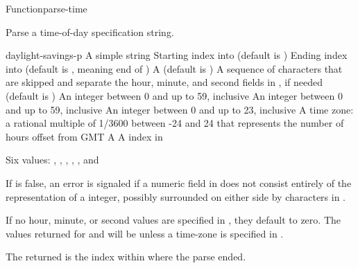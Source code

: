 \documentclass[10pt,twoside,english,pdftex]{article}
\begin{document}

\begin{functiondoc}{Function}{parse-time}{%
     
    }
% 

\fnsyntax

\fnpurpose Parse a time-of-day specification string.

\fnpackage {} 

\fnmodule {}

\fnargs
\begin{args}{daylight-savings-p}
\arg[string] A simple string
\arg[start] Starting index into  (default is )
\arg[end] Ending index into  (default is \nil, meaning
end of )
 A  (default is \nil)
\arg[separators] A sequence of characters that are skipped and separate the
 hour, minute, and second fields in , if needed (default is 
 )
\arg[second] An integer between 0 and up to 59, inclusive
\arg[minute] An integer between 0 and up to 59, inclusive
\arg[hour] An integer between 0 and up to 23, inclusive
 A time zone: a rational multiple of 1/3600 between
 -24 and 24 that represents the number of hours offset from GMT
 A 
\arg[position] A index in 
\end{args}

\fnreturns Six values: , , ,
, , and

\fnerrors
%
If  is false, an error is signaled if a numeric field in
 does not consist entirely of the representation of a integer,
possibly surrounded on either side by characters in .

\fndescription
%
If no hour, minute, or second values are specified in , they
default to zero.  The values returned for  and
 will be \nil{} unless a time-zone is specified
in .

The returned  is the index within  where the
parse ended.


\end{functiondoc}
\end{document}
